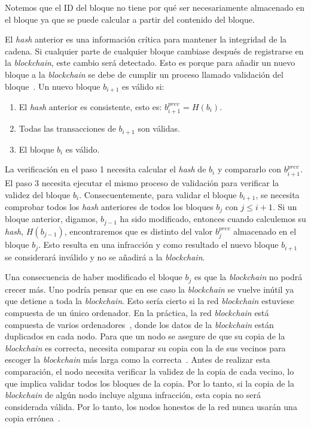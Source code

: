 Notemos que el ID del bloque no tiene por qué ser necesariamente almacenado en el bloque ya que se puede calcular a partir del contenido del bloque.

El \textit{hash} anterior es una información crítica para mantener la integridad de la cadena. Si cualquier parte de cualquier bloque cambiase después de registrarse en la \textit{blockchain}, este cambio será detectado. Esto es porque para añadir un nuevo bloque a la \textit{blockchain} se debe de cumplir un proceso llamado validación del bloque~\cite{duc-2023}. Un nuevo bloque $b_{i+1}$ es válido si:
\begin{enumerate}
    \item El \textit{hash} anterior es consistente, esto es: $b_{i+1}^{prev} = H(b_i)$.
    \item Todas las transacciones de $b_{i+1}$ son válidas.
    \item El bloque $b_i$ es válido.
\end{enumerate}

La verificación en el paso 1 necesita calcular el \textit{hash} de $b_i$ y compararlo con $b_{i+1}^{prev}$. El paso 3 necesita ejecutar el mismo proceso de validación para verificar la validez del bloque $b_i$. Consecuentemente, para validar el bloque $b_{i+1}$, se necesita comprobar todos los \textit{hash} anteriores de todos los bloques $b_j$ con $j \le i+1$. Si un bloque anterior, digamos, $b_{j-1}$ ha sido modificado, entonces cuando calculemos su \textit{hash}, $H(b_{j-1})$, encontraremos que es distinto del valor $b_j^{prev}$ almacenado en el bloque $b_j$. Esto resulta en una infracción y como resultado el nuevo bloque $b_{i+1}$ se considerará inválido y no se añadirá a la \textit{blockchain}.

Una consecuencia de haber modificado el bloque $b_j$ es que la \textit{blockchain} no podrá crecer más. Uno podría pensar que en ese caso la \textit{blockchain} se vuelve inútil ya que detiene a toda la \textit{blockchain}. Esto sería cierto si la red \textit{blockchain} estuviese compuesta de un único ordenador. En la práctica, la red \textit{blockchain} está compuesta de varios ordenadores~\cite{duc-2023}, donde los datos de la \textit{blockchain} están duplicados en cada nodo. Para que un nodo se asegure de que su copia de la \textit{blockchain} es correcta, necesita comparar su copia con la de sus vecinos para escoger la \textit{blockchain} más larga como la correcta~\cite{bitcoin}. Antes de realizar esta comparación, el nodo necesita verificar la validez de la copia de cada vecino, lo que implica validar todos los bloques de la copia. Por lo tanto, si la copia de la \textit{blockchain} de algún nodo incluye alguna infracción, esta copia no será considerada válida. Por lo tanto, los nodos honestos de la red nunca usarán una copia errónea~\cite{bitcoin}.

